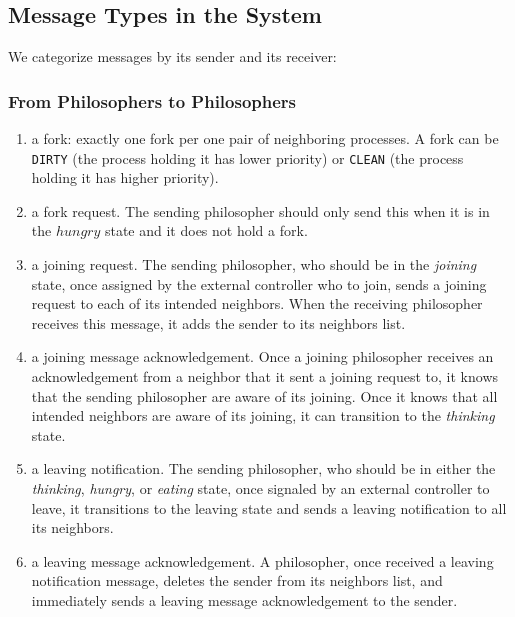 \documentclass[11pt]{article}
\begin{document}
\subsection{Message Types in the System}
We categorize messages by its sender and its receiver:
\subsubsection{From Philosophers to Philosophers}
\begin{enumerate}[M1]
\item \label{M:fork} a fork: exactly one fork per one pair of neighboring processes. A fork can be \texttt{DIRTY} (the process holding it has lower priority) or \texttt{CLEAN} (the process holding it has higher priority).
\item \label{M:fork_request} a fork request. The sending philosopher should only send this when it is in the $hungry$ state and it does not hold a fork.
\item \label{M:joining_request} a joining request. The sending philosopher, who should be in the \textit{joining} state, once assigned by the external controller who to join, sends a joining request to each of its intended neighbors. When the receiving philosopher receives this message, it adds the sender to its neighbors list.
\item \label{M:joining_ack} a joining message acknowledgement. Once a joining philosopher receives an acknowledgement from a neighbor that it sent a joining request to, it knows that the sending philosopher are aware of its joining. Once it knows that all intended neighbors are aware of its joining, it can transition to the \emph{thinking} state.
\item \label{M:leaving_notification} a leaving notification. The sending philosopher, who should be in either the \textit{thinking}, \textit{hungry}, or \textit{eating} state, once signaled by an external controller to leave, it transitions to the leaving state and sends a leaving notification to all its neighbors.
\item \label{M:leaving_ack} a leaving message acknowledgement. A philosopher, once received a leaving notification message, deletes the sender from its neighbors list, and immediately sends a leaving message acknowledgement to the sender.
\end{enumerate}
\end{document}
